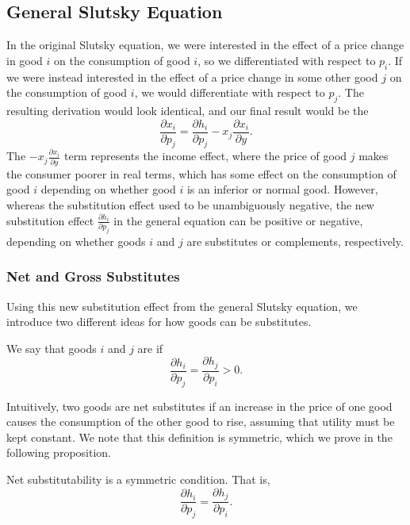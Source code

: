 \subsection*{General Slutsky Equation}
In the original Slutsky equation, we were interested in the effect of a price change in good $i$ on the consumption of good $i$, so we differentiated with respect to $p_i$. If we were instead interested in the effect of a price change in some other good $j$ on the consumption of good $i$, we would differentiate with respect to $p_j$. The resulting derivation would look identical, and our final result would be the 
$$
\boxed{\frac{\partial x_{i}}{\partial p_{j}}=\frac{\partial h_{i}}{\partial p_{j}}-x_{j} \frac{\partial x_{i}}{\partial y}.}
$$
The $-x_{j} \frac{\partial x_{i}}{\partial y}$ term represents the income effect, where the price of good $j$ makes the consumer poorer in real terms, which has some effect on the consumption of good $i$ depending on whether good $i$ is an inferior or normal good. However, whereas the substitution effect used to be unambiguously negative, the new substitution effect $\frac{\partial h_{i}}{\partial p_{j}}$ in the general equation can be positive or negative, depending on whether goods $i$ and $j$ are substitutes or complements, respectively.

\subsubsection*{Net and Gross Substitutes}
Using this new substitution effect from the general Slutsky equation, we introduce two different ideas for how goods can be substitutes.

\begin{definition*}
We say that goods $i$ and $j$ are  if 
$$
\frac{\partial h_{i}}{\partial p_{j}}=\frac{\partial h_{j}}{\partial p_{i}}>0.
$$
\end{definition*}
Intuitively, two goods are net substitutes if an increase in the price of one good causes the consumption of the other good to rise, assuming that utility must be kept constant. We note that this definition is symmetric, which we prove in the following proposition.

\begin{proposition*}
Net substitutability is a symmetric condition. That is, $$\frac{\partial h_{i}}{\partial p_{j}}=\frac{\partial h_{j}}{\partial p_{i}}.$$ 
\end{proposition*}


